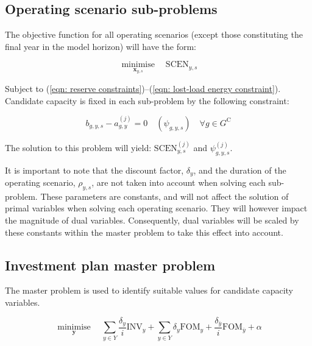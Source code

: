 \documentclass{article}
\newcommand{\sGeneratorsCandidate}{G^{\mathrm{C}}}
\newcommand{\sYears}{Y}
\newcommand{\iGenerator}{g}
\newcommand{\iYear}{y}
\newcommand{\iYearTerminal}{\overline{\iYear}}
\newcommand{\iScenario}{s}
\newcommand{\cFixedOperationsMaintenanceCost}[1][\iYear]{\mathrm{FOM}_{#1}}
\newcommand{\cScenarioDuration}[1][\iYear,\iScenario]{\rho_{#1}}
\newcommand{\cInvestmentCost}[1][\iYear]{\mathrm{INV}_{#1}}
\newcommand{\cInterestRate}{i}
\newcommand{\cOperatingCostScenario}[1][\iYear,\iScenario]{\mathrm{SCEN}_{#1}}
\newcommand{\cDiscountRate}[1][\iYear]{\delta_{#1}}
\newcommand{\vInstalledCapacityTotal}[1][\iGenerator,\iYear]{a_{#1}}
\newcommand{\vInstalledCapacityTotalScenario}[1][\iGenerator,\iYear,\iScenario]{b_{#1}}
\newcommand{\vFixedCapacityDual}[1][\iGenerator,\iYear,\iScenario]{\psi_{#1}}
\DeclareMathOperator*{\minimise}{minimise}
\begin{document}
\subsection{Operating scenario sub-problems}
The objective function for all operating scenarios (except those constituting the final year in the model horizon) will have the form:

\begin{equation}
	\minimise\limits_{\bm{x}_{\iYear,\iScenario}} \quad \cOperatingCostScenario 
\end{equation}

Subject to (\ref{eqn: reserve constraints})--(\ref{eqn: lost-load energy constraint}). Candidate capacity is fixed in each sub-problem by the following constraint: 

\begin{equation}
\vInstalledCapacityTotalScenario - \vInstalledCapacityTotal^{(j)} = 0 \quad (\vFixedCapacityDual) \quad \forall \iGenerator \in \sGeneratorsCandidate
\end{equation}

The solution to this problem will yield: $\cOperatingCostScenario^{(j)}$ and $\vFixedCapacityDual^{(j)}$.

It is important to note that the discount factor, $\cDiscountRate$, and the duration of the operating scenario, $\cScenarioDuration$, are not taken into account when solving each sub-problem. These parameters are constants, and will not affect the solution of primal variables when solving each operating scenario. They will however impact the magnitude of dual variables. Consequently, dual variables will be scaled by these constants within the master problem to take this effect into account.

\subsection{Investment plan master problem}
The master problem is used to identify suitable values for candidate capacity variables.

\begin{equation}
	\minimise\limits_{\bm{y}} \quad \sum\limits_{\iYear \in \sYears} \frac{\cDiscountRate}{\cInterestRate}\cInvestmentCost + \sum\limits_{\iYear \in \sYears} \cDiscountRate \cFixedOperationsMaintenanceCost  + \frac{\cDiscountRate[\iYearTerminal]}{\cInterestRate} \cFixedOperationsMaintenanceCost[\iYearTerminal] + \alpha
\end{equation}
\end{document}
